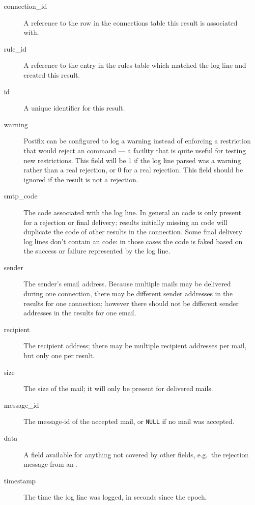 \documentclass[a4paper,12pt,draft]{article}
\begin{document}
\begin{description}

    \item [connection\_id] A reference to the row in the connections table
        this result is associated with.

    \item [rule\_id] A reference to the entry in the rules table which
        matched the log line and created this result.

    \item [id] A unique identifier for this result.

    \item [warning] Postfix can be configured to log a warning instead of
        enforcing a restriction that would reject an \SMTP{} command --- a
        facility that is quite useful for testing new restrictions.  This
        field will be 1 if the log line parsed was a warning rather than a
        real rejection, or 0 for a real rejection.  This field should be
        ignored if the result is not a rejection.

    \item [smtp\_code] The \SMTP{} code associated with the log line.  In
        general an \SMTP{} code is only present for a rejection or final
        delivery; results initially missing an \SMTP{} code will duplicate
        the \SMTP{} code of other results in the connection.  Some final
        delivery log lines don't contain an \SMTP{} code: in those cases
        the code is faked based on the success or failure represented by
        the log line.

    \item [sender] The sender's email address.  Because multiple mails may
        be delivered during one connection, there may be different sender
        addresses in the results for one connection; however there should
        not be different sender addresses in the results for one email.

    \item [recipient] The recipient address; there may be multiple
        recipient addresses per mail, but only one per result.

    \item [size] The size of the mail; it will only be present for
        delivered mails.

    \item [message\_id] The message-id of the accepted mail, or
        \texttt{NULL} if no mail was accepted.

    \item [data] A field available for anything not covered by other
        fields, e.g.\ the rejection message from an \RBL{}\@.

    \item [timestamp] The time the log line was logged, in seconds since
        the epoch.

\end{description}
\end{document}

